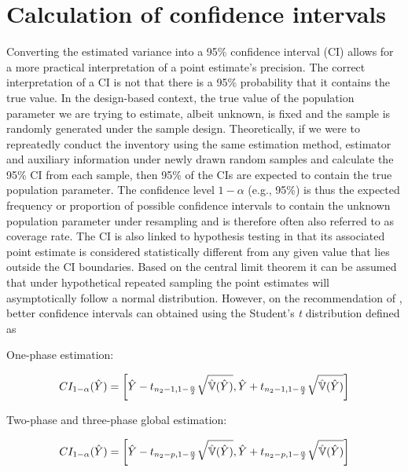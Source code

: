 \documentclass[article]{jss}
\newcommand{\var}{\mathbb{V}}
\begin{document}

\section{Calculation of confidence intervals}
\label{sec:confint_calc}

Converting the estimated variance into a 95\% confidence interval (CI) allows for a more practical interpretation of a point estimate's precision. The correct interpretation of a CI is not that there is a 95\% probability that it contains the true value. In the design-based context, the true value of the population parameter we are trying to estimate, albeit unknown, is fixed and the sample is randomly generated under the sample design. Theoretically, if we were to repreatedly conduct the inventory using the same estimation method, estimator and auxiliary information under newly drawn random samples and calculate the 95\%  CI from each sample, then 95\% of the CIs are expected to contain the true population parameter. The confidence level $1-\alpha$ (e.g., 95\%) is thus the expected frequency or proportion of possible confidence intervals to contain the unknown population parameter under resampling and is therefore often also referred to as coverage rate. The CI is also linked to hypothesis testing in that its associated point estimate is considered statistically different from any given value that lies outside the CI boundaries. Based on the central limit theorem it can be assumed that under hypothetical repeated sampling the point estimates will asymptotically follow a normal distribution. However, on the recommendation of \citet{mandallaz2013a}, better confidence intervals can obtained using the Student's \textit{t} distribution defined as

\vspace{4mm}

One-phase estimation:

\begin{equation}\label{ci_1phase}
CI_{1-\alpha}(\hat{Y})=\bigg{\lbrack}\hat{Y}-t_{n_{2}-1, 1-\frac{\alpha}{2}}\sqrt{\hat{\var}(\hat{Y})},
                              \hat{Y}+t_{n_{2}-1, 1-\frac{\alpha}{2}}\sqrt{\hat{\var}(\hat{Y})}\bigg{\rbrack}
\end{equation}


Two-phase and three-phase global estimation:

\begin{equation}\label{ci_2phase_global}
CI_{1-\alpha}(\hat{Y})=\bigg{\lbrack}\hat{Y}-t_{n_{2}-p, 1-\frac{\alpha}{2}}\sqrt{\hat{\var}(\hat{Y})},
                              \hat{Y}+t_{n_{2}-p, 1-\frac{\alpha}{2}}\sqrt{\hat{\var}(\hat{Y})}\bigg{\rbrack}
\end{equation}
\end{document}
